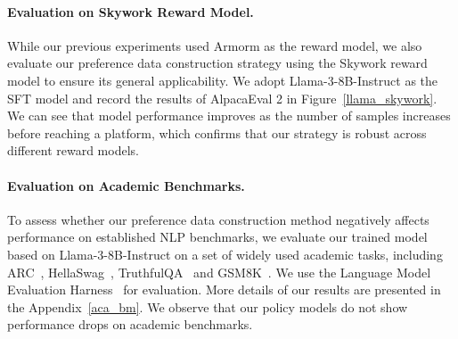 
% 

\paragraph{Evaluation on Skywork Reward Model.}  
While our previous experiments used Armorm as the reward model, we also evaluate our preference data construction strategy using the Skywork reward model to ensure its general applicability. 
We adopt Llama-3-8B-Instruct as the SFT model and record the results of AlpacaEval 2 in Figure~\ref{llama_skywork}. 
We can see that model performance improves as the number of samples increases before reaching a platform, which confirms that our strategy is robust across different reward models.  

\paragraph{Evaluation on Academic Benchmarks.}
To assess whether our preference data construction method negatively affects performance on established NLP benchmarks, we evaluate our trained model based on Llama-3-8B-Instruct on a set of widely used academic tasks, including ARC~\cite{clark2018thinksolvedquestionanswering}, HellaSwag~\cite{zellers-etal-2019-hellaswag}, TruthfulQA~\cite{lin-etal-2022-truthfulqa} and GSM8K~\cite{cobbe2021trainingverifierssolvemath}. 
We use the Language Model Evaluation Harness~\cite{eval-harness} for evaluation. 
More details of our results are presented in the Appendix~\ref{aca_bm}. 
We observe that our policy models do not show performance drops on academic benchmarks.




%

%

 

